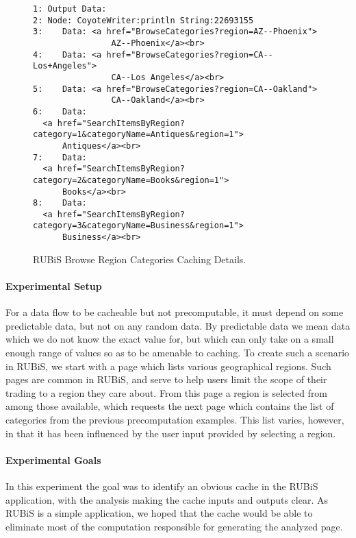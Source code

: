\documentclass[msc,oneside]{ubcthesis}
\begin{document}
\begin{figure}[ht]
  \caption{\label{fig:browseregioncategoriescd} RUBiS Browse Region Categories Caching Details.}
\begin{verbatim}
1: Output Data:
2: Node: CoyoteWriter:println String:22693155
3:    Data: <a href="BrowseCategories?region=AZ--Phoenix">
                AZ--Phoenix</a><br>
4:    Data: <a href="BrowseCategories?region=CA--Los+Angeles">
                CA--Los Angeles</a><br>
5:    Data: <a href="BrowseCategories?region=CA--Oakland">
                CA--Oakland</a><br>
6:    Data: 
  <a href="SearchItemsByRegion?category=1&categoryName=Antiques&region=1">
      Antiques</a><br>
7:    Data: 
  <a href="SearchItemsByRegion?category=2&categoryName=Books&region=1">
      Books</a><br>
8:    Data: 
  <a href="SearchItemsByRegion?category=3&categoryName=Business&region=1">
      Business</a><br>
\end{verbatim}
\end{figure}

\paragraph{Experimental Setup}
For a data flow to be cacheable but not precomputable, it must depend on some predictable data, but not on any random data. By predictable data we mean data which we do not know the exact value for, but which can only take on a small enough range of values so as to be amenable to caching. To create such a scenario in RUBiS, we start with a page which lists various geographical regions. Such pages are common in RUBiS, and serve to help users limit the scope of their trading to a region they care about. From this page a region is selected from among those available, which requests the next page which contains the list of categories from the previous precomputation examples. This list varies, however, in that it has been influenced by the user input provided by selecting a region.

\paragraph{Experimental Goals}
In this experiment the goal was to identify an obvious cache in the RUBiS application, with the analysis making the cache inputs and outputs clear. As RUBiS is a simple application, we hoped that the cache would be able to eliminate most of the computation responsible for generating the analyzed page.
\end{document}
